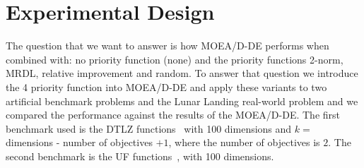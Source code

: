 \section{Experimental Design}

%


The question that we want to answer is how MOEA/D-DE performs when combined with: no priority function (none) and the priority functions 2-norm, MRDL, relative improvement and random. To answer that question we introduce the 4 priority function into MOEA/D-DE and apply these variants to two artificial benchmark problems and the Lunar Landing real-world problem and we compared the performance against the results of the MOEA/D-DE. The first benchmark used is the DTLZ functions~\cite{deb2005scalable} with 100 dimensions and $k =$ dimensions - number of objectives $+ 1$, where the number of objectives is $2$. The second benchmark is the UF functions~\cite{zhang2008multiobjective}, with 100 dimensions. 




